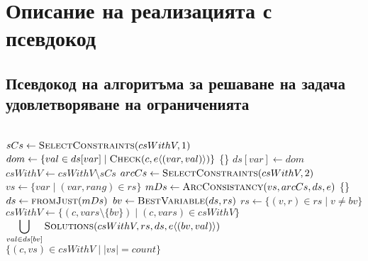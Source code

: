 \documentclass[a4paper, 12pt]{article}
\begin{document}
\section{Описание на реализацията с псевдокод}
\subsection{Псевдокод на алгоритъма за решаване на задача удовлетворяване на ограниченията}
\begin{algorithm}[H]
\begin{algorithmic}
    \State \Return {}
\EndFunction \\
    \State \(sCs \gets \Call{SelectConstraints}{csWithV, 1}\)
        \State \(dom \gets \{val \in ds[var] \; | \; \Call{Check}{c, e\langle(var, val)\rangle}\}\)
            \State \Return \{\}
        \Else
            \State \(ds[var] \gets dom\)
        \EndIf
    \EndFor
    \State \(csWithV \gets csWithV \setminus sCs\)
    \State \(arcCs \gets \Call{SelectConstraints}{csWithV, 2}\)
    \State \(vs \gets \{var \; | \; (var, rang) \in rs \}\)
    \State \(mDs \gets \Call{ArcConsistancy}{vs, arcCs, ds, e}\)
        \State \Return \{\}
    \EndIf
    \State \(ds \gets \Call{fromJust}{mDs}\)
    \State \(bv \gets \Call{BestVariable}{ds, rs}\)
    \State \(rs \gets \{(v, r) \in rs \; | \; v \neq bv\}\)
    \State \(csWithV \gets \{(c, vars \setminus \{bv\}) \; | \; (c, vars) \in csWithV\}\)
    \State \Return \(\displaystyle\bigcup_{val \in ds[bv]} \Call{Solutions}{csWithV, rs, ds, e\langle(bv, val)\rangle}\)
\EndFunction \\
    \State \Return \(\{(c, vs) \in csWithV \; | \; |vs| = count\}\)
\EndFunction
\end{algorithmic}
\end{algorithm}
\end{document}
